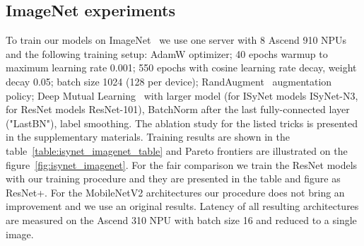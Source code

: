 \documentclass[letterpaper]{article}
\begin{document}
\subsection{ImageNet experiments}

To train our models on ImageNet~\cite{ILSVRC15} we use one server with 8 Ascend 910 NPUs and the following training setup: AdamW optimizer; 40 epochs warmup to maximum learning rate 0.001; 550 epochs with cosine learning rate decay,  weight decay 0.05; batch size 1024 (128 per device); RandAugment~\cite{cubuk2019randaugment} augmentation policy; Deep Mutual Learning~\cite{zhang2017deep} with larger model (for ISyNet models ISyNet-N3, for ResNet models ResNet-101), BatchNorm after the last fully-connected layer ("LastBN"), label smoothing.
The ablation study for the listed tricks is presented in the supplementary materials.
Training results are shown in the table~\ref{table:isynet_imagenet_table} and Pareto frontiers are illustrated on the figure~\ref{fig:isynet_imagenet}. For the fair comparison we train the ResNet models with our training procedure and they are presented in the table and figure as ResNet+. For the MobileNetV2 architectures our procedure does not bring an improvement and we use an original results.
Latency of all resulting architectures are measured on the Ascend 310 NPU with batch size 16 and reduced to a single image.
\end{document}
